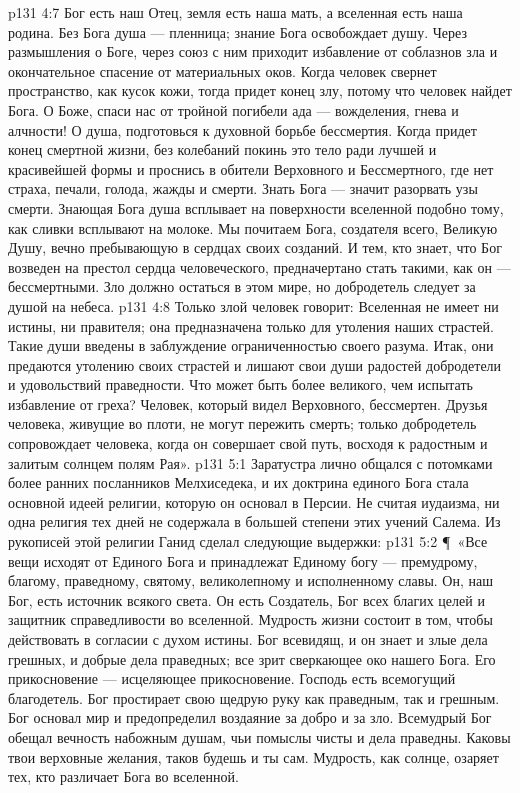 \vs p131 4:7 Бог есть наш Отец, земля есть наша мать, а вселенная есть наша родина. Без Бога душа --- пленница; знание Бога освобождает душу. Через размышления о Боге, через союз с ним приходит избавление от соблазнов зла и окончательное спасение от материальных оков. Когда человек свернет пространство, как кусок кожи, тогда придет конец злу, потому что человек найдет Бога. О Боже, спаси нас от тройной погибели ада --- вожделения, гнева и алчности! О душа, подготовься к духовной борьбе бессмертия. Когда придет конец смертной жизни, без колебаний покинь это тело ради лучшей и красивейшей формы и проснись в обители Верховного и Бессмертного, где нет страха, печали, голода, жажды и смерти. Знать Бога --- значит разорвать узы смерти. Знающая Бога душа всплывает на поверхности вселенной подобно тому, как сливки всплывают на молоке. Мы почитаем Бога, создателя всего, Великую Душу, вечно пребывающую в сердцах своих созданий. И тем, кто знает, что Бог возведен на престол сердца человеческого, предначертано стать такими, как он --- бессмертными. Зло должно остаться в этом мире, но добродетель следует за душой на небеса.
\vs p131 4:8 Только злой человек говорит: Вселенная не имеет ни истины, ни правителя; она предназначена только для утоления наших страстей. Такие души введены в заблуждение ограниченностью своего разума. Итак, они предаются утолению своих страстей и лишают свои души радостей добродетели и удовольствий праведности. Что может быть более великого, чем испытать избавление от греха? Человек, который видел Верховного, бессмертен. Друзья человека, живущие во плоти, не могут пережить смерть; только добродетель сопровождает человека, когда он совершает свой путь, восходя к радостным и залитым солнцем полям Рая».
\vs p131 5:1 Заратустра лично общался с потомками более ранних посланников Мелхиседека, и их доктрина единого Бога стала основной идеей религии, которую он основал в Персии. Не считая иудаизма, ни одна религия тех дней не содержала в большей степени этих учений Салема. Из рукописей этой религии Ганид сделал следующие выдержки:
\vs p131 5:2 \P\ «Все вещи исходят от Единого Бога и принадлежат Единому богу --- премудрому, благому, праведному, святому, великолепному и исполненному славы. Он, наш Бог, есть источник всякого света. Он есть Создатель, Бог всех благих целей и защитник справедливости во вселенной. Мудрость жизни состоит в том, чтобы действовать в согласии с духом истины. Бог всевидящ, и он знает и злые дела грешных, и добрые дела праведных; все зрит сверкающее око нашего Бога. Его прикосновение --- исцеляющее прикосновение. Господь есть всемогущий благодетель. Бог простирает свою щедрую руку как праведным, так и грешным. Бог основал мир и предопределил воздаяние за добро и за зло. Всемудрый Бог обещал вечность набожным душам, чьи помыслы чисты и дела праведны. Каковы твои верховные желания, таков будешь и ты сам. Мудрость, как солнце, озаряет тех, кто различает Бога во вселенной.
